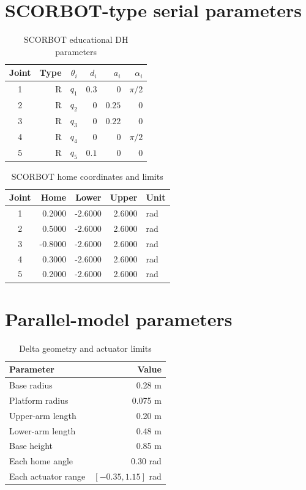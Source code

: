 \section{SCORBOT-type serial parameters}
\begin{table}[H]\centering
\caption{SCORBOT educational DH parameters}
\begin{tabular}{crrrrr}\toprule
Joint & Type & $\theta_i$ & $d_i$ & $a_i$ & $\alpha_i$\\\midrule
1&R&$q_1$&$0.3$&$0$&$\pi/2$\\
2&R&$q_2$&$0$&$0.25$&$0$\\
3&R&$q_3$&$0$&$0.22$&$0$\\
4&R&$q_4$&$0$&$0$&$\pi/2$\\
5&R&$q_5$&$0.1$&$0$&$0$\\
\bottomrule\end{tabular}\end{table}
\begin{table}[H]\centering
\caption{SCORBOT home coordinates and limits}
\begin{tabular}{crrrl}\toprule Joint & Home & Lower & Upper & Unit\\\midrule
1&0.2000&-2.6000&2.6000&rad\\
2&0.5000&-2.6000&2.6000&rad\\
3&-0.8000&-2.6000&2.6000&rad\\
4&0.3000&-2.6000&2.6000&rad\\
5&0.2000&-2.6000&2.6000&rad\\
\bottomrule\end{tabular}\end{table}
\clearpage\section{Parallel-model parameters}
\begin{table}[H]\centering\caption{Delta geometry and actuator limits}
\begin{tabular}{lr}\toprule Parameter&Value\\\midrule Base radius&0.28 m\\Platform radius&0.075 m\\Upper-arm length&0.20 m\\Lower-arm length&0.48 m\\Base height&0.85 m\\Each home angle&0.30 rad\\Each actuator range&$[-0.35,1.15]$ rad\\\bottomrule\end{tabular}\end{table}
